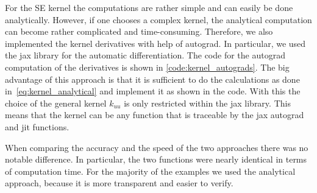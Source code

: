 \documentclass{article}
\begin{document}
For the SE kernel the computations are rather simple and can easily be done analytically. However, if one chooses a complex kernel, the analytical computation can become rather complicated and time-consuming. Therefore, we also implemented the kernel derivatives with help of autograd. In particular, we used the jax library for the automatic differentiation. The code for the autograd computation of the derivatives is shown in \ref{code:kernel_autograds}. The big advantage of this approach is that it is sufficient to do the calculations as done in~\ref{eq:kernel_analytical} and implement it as shown in the code. With this the choice of the general kernel $k_{uu}$ is only restricted within the jax library. This means that the kernel can be any function that is traceable by the jax autograd and jit functions. 

When comparing the accuracy and the speed of the two approaches there was no notable difference. In particular, the two functions were nearly identical in terms of computation time. For the majority of the examples we used the analytical approach, because it is more transparent and easier to verify.
\end{document}
